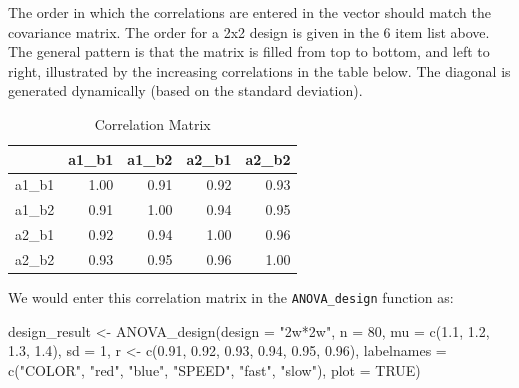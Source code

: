 \documentclass[
]{book}
\newenvironment{Shaded}{\begin{snugshade}}{\end{snugshade}}
\newcommand{\AttributeTok}[1]{\textcolor[rgb]{0.77,0.63,0.00}{#1}}
\newcommand{\ConstantTok}[1]{\textcolor[rgb]{0.00,0.00,0.00}{#1}}
\newcommand{\DecValTok}[1]{\textcolor[rgb]{0.00,0.00,0.81}{#1}}
\newcommand{\FloatTok}[1]{\textcolor[rgb]{0.00,0.00,0.81}{#1}}
\newcommand{\FunctionTok}[1]{\textcolor[rgb]{0.00,0.00,0.00}{#1}}
\newcommand{\NormalTok}[1]{#1}
\newcommand{\OtherTok}[1]{\textcolor[rgb]{0.56,0.35,0.01}{#1}}
\newcommand{\StringTok}[1]{\textcolor[rgb]{0.31,0.60,0.02}{#1}}
\begin{document}
The order in which the correlations are entered in the vector should match the covariance matrix.
The order for a 2x2 design is given in the 6 item list above. The general pattern is that the matrix is filled from top to bottom, and left to right, illustrated by the increasing correlations in the table below.
The diagonal is generated dynamically (based on the standard deviation).

\begin{table}

\caption{\label{tab:unnamed-chunk-25}Correlation Matrix}
\centering
\begin{tabular}[t]{l|r|r|r|r}
\hline
  & a1\_b1 & a1\_b2 & a2\_b1 & a2\_b2\\
\hline
a1\_b1 & 1.00 & 0.91 & 0.92 & 0.93\\
\hline
a1\_b2 & 0.91 & 1.00 & 0.94 & 0.95\\
\hline
a2\_b1 & 0.92 & 0.94 & 1.00 & 0.96\\
\hline
a2\_b2 & 0.93 & 0.95 & 0.96 & 1.00\\
\hline
\end{tabular}
\end{table}

\newpage

We would enter this correlation matrix in the \texttt{ANOVA\_design} function as:

\begin{Shaded}
\begin{Highlighting}[]
\NormalTok{design\_result }\OtherTok{\textless{}{-}} \FunctionTok{ANOVA\_design}\NormalTok{(}\AttributeTok{design =} \StringTok{"2w*2w"}\NormalTok{,}
                              \AttributeTok{n =} \DecValTok{80}\NormalTok{,}
                              \AttributeTok{mu =} \FunctionTok{c}\NormalTok{(}\FloatTok{1.1}\NormalTok{, }\FloatTok{1.2}\NormalTok{,}
                                     \FloatTok{1.3}\NormalTok{, }\FloatTok{1.4}\NormalTok{),}
                              \AttributeTok{sd =} \DecValTok{1}\NormalTok{,}
\NormalTok{                              r }\OtherTok{\textless{}{-}} \FunctionTok{c}\NormalTok{(}\FloatTok{0.91}\NormalTok{, }\FloatTok{0.92}\NormalTok{,}
                                     \FloatTok{0.93}\NormalTok{, }\FloatTok{0.94}\NormalTok{,}
                                     \FloatTok{0.95}\NormalTok{, }\FloatTok{0.96}\NormalTok{),}
                              \AttributeTok{labelnames =} \FunctionTok{c}\NormalTok{(}\StringTok{"COLOR"}\NormalTok{,}
                                             \StringTok{"red"}\NormalTok{, }\StringTok{"blue"}\NormalTok{,}
                                             \StringTok{"SPEED"}\NormalTok{,}
                                             \StringTok{"fast"}\NormalTok{, }\StringTok{"slow"}\NormalTok{),}
                              \AttributeTok{plot =} \ConstantTok{TRUE}\NormalTok{)}
\end{Highlighting}
\end{Shaded}
\end{document}
